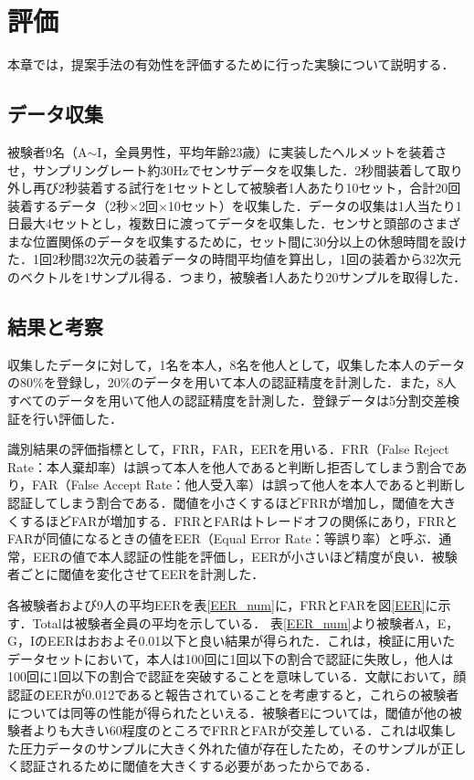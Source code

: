 \chapter{評価}
\label{evaluation}
本章では，提案手法の有効性を評価するために行った実験について説明する．

\section{データ収集}
被験者9名（A$\sim$I，全員男性，平均年齢23歳）に実装したヘルメットを装着させ，サンプリングレート約30Hzでセンサデータを収集した．2秒間装着して取り外し再び2秒装着する試行を1セットとして被験者1人あたり10セット，合計20回装着するデータ（2秒$\times$2回$\times$10セット）を収集した．データの収集は1人当たり1日最大4セットとし，複数日に渡ってデータを収集した．センサと頭部のさまざまな位置関係のデータを収集するために，セット間に30分以上の休憩時間を設けた．1回2秒間32次元の装着データの時間平均値を算出し，1回の装着から32次元のベクトルを1サンプル得る．つまり，被験者1人あたり20サンプルを取得した．

\section{結果と考察}
収集したデータに対して，1名を本人，8名を他人として，収集した本人のデータの80\%を登録し，20\%のデータを用いて本人の認証精度を計測した．また，8人すべてのデータを用いて他人の認証精度を計測した．登録データは5分割交差検証を行い評価した．

識別結果の評価指標として，FRR，FAR，EERを用いる．FRR（False Reject Rate：本人棄却率）は誤って本人を他人であると判断し拒否してしまう割合であり，FAR（False Accept Rate：他人受入率）は誤って他人を本人であると判断し認証してしまう割合である．閾値を小さくするほどFRRが増加し，閾値を大きくするほどFARが増加する．FRRとFARはトレードオフの関係にあり，FRRとFARが同値になるときの値をEER（Equal Error Rate：等誤り率）と呼ぶ．通常，EERの値で本人認証の性能を評価し，EERが小さいほど精度が良い．被験者ごとに閾値を変化させてEERを計測した．

各被験者および9人の平均EERを表\ref{EER_num}に，FRRとFARを図\ref{EER}に示す．Totalは被験者全員の平均を示している．
表\ref{EER_num}より被験者A，E，G，IのEERはおおよそ0.01以下と良い結果が得られた．これは，検証に用いたデータセットにおいて，本人は100回に1回以下の割合で認証に失敗し，他人は100回に1回以下の割合で認証を突破することを意味している．文献\cite{face_auth}において，顔認証のEERが0.012であると報告されていることを考慮すると，これらの被験者については同等の性能が得られたといえる．被験者Eについては，閾値が他の被験者よりも大きい60程度のところでFRRとFARが交差している．これは収集した圧力データのサンプルに大きく外れた値が存在したため，そのサンプルが正しく認証されるために閾値を大きくする必要があったからである．

